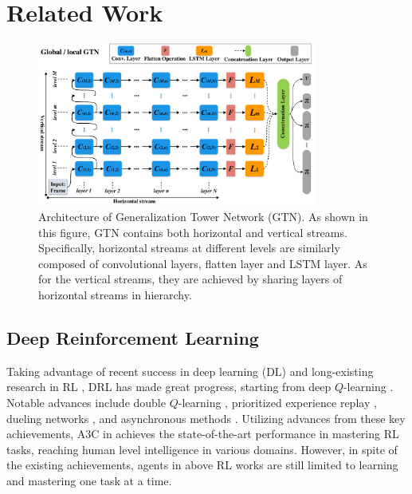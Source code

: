 \documentclass[letterpaper]{article} %
\begin{document}
\section{Related Work}
\label{Related Work}
\begin{figure}[htb]
	\begin{center}
		\centerline{\includegraphics[width=0.82\textwidth]{figure/figure-main-framework}}
		\caption{
			Architecture of Generalization Tower Network (GTN).
			As shown in this figure, GTN contains both horizontal and vertical streams.
			Specifically, horizontal streams at different levels are similarly composed of convolutional layers, flatten layer and LSTM layer.
			As for the vertical streams, they are achieved by sharing layers of horizontal streams in hierarchy.
		}
		\label{figure-main-framework}
	\end{center}
\end{figure}
\subsection{Deep Reinforcement Learning}
Taking advantage of recent success in deep learning (DL) \cite{lecun2015deep} and long-existing research in RL \cite{sutton1998reinforcement}, DRL has made great progress, starting from deep $Q$-learning \cite{mnih2015human}. Notable advances include double $Q$-learning \cite{van2016deep}, prioritized experience replay \cite{schaul2015prioritized}, dueling networks \cite{wang2016dueling}, and asynchronous methods \cite{mnih2016asynchronous}. Utilizing advances from these key achievements, A3C in \cite{mnih2016asynchronous} achieves the state-of-the-art performance in mastering RL tasks, reaching human level intelligence in various domains. However, in spite of the existing achievements, agents in above RL works are still limited to learning and mastering one task at a time.
\end{document}
